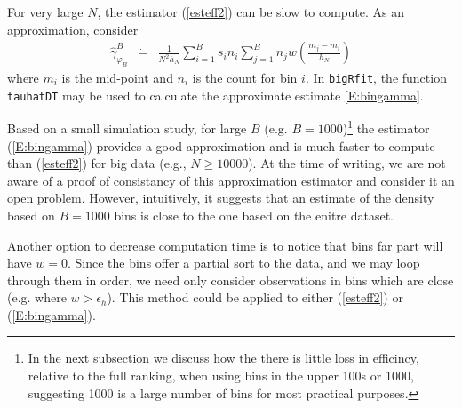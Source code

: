 For very large $N$, the estimator (\ref{esteff2}) can be slow to compute.
As an approximation, consider
\begin{eqnarray}
\label{E:bingamma}
\widehat{\gamma}_{\varphi_B}^B
	&\dot =& 
	\frac{1}{N^2 h_N} \sum_{i=1}^B s_i n_i \sum_{j=1}^B  n_j w \left( \frac{m_j - m_i}{h_N}\right)
\end{eqnarray}
where $m_i$ is the mid-point and $n_i$ is the count for bin $i$.
In \verb|bigRfit|, the function \verb|tauhatDT| may be used to calculate the approximate estimate \ref{E:bingamma}.

Based on a small simulation study, for large $B$ (e.g. $B = 1000$)\footnote{In the next subsection we discuss how the there is little loss in efficincy, relative to the full ranking, when using bins in the upper 100s or 1000, suggesting 1000 is a large number of bins for most practical purposes.}
the estimator (\ref{E:bingamma}) provides a good approximation 
and is much faster to compute 
than (\ref{esteff2}) 
for big data (e.g., $N \ge 10000$).
At the time of writing, we are not aware of a proof of consistancy of this approximation estimator and consider it an open problem.
However, intuitively, it suggests that an estimate of the density based on $B=1000$ bins is close to the one based on the enitre dataset.

Another option to decrease computation time is to notice that bins far part will have $w \dot = 0$.  
Since the bins offer a partial sort to the data, and we may loop through them in order, 
we need only consider observations in bins which are close (e.g. where $w > \epsilon_h$).
This method could be applied to either (\ref{esteff2}) or (\ref{E:bingamma}).

